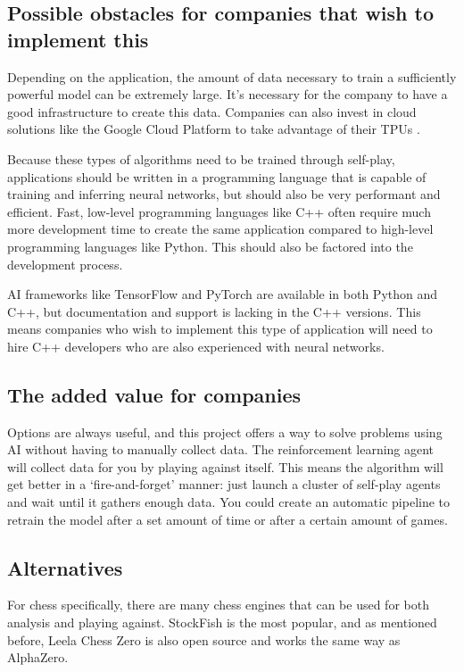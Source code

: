 \documentclass{article}
\begin{document}
\subsection{Possible obstacles for companies that wish to implement this}

Depending on the application, the amount of data necessary to train a sufficiently powerful model
can be extremely large. It's necessary for the company to have a good infrastructure to 
create this data. Companies can also invest in cloud solutions like the Google Cloud Platform
to take advantage of their TPUs \cite{CloudComputingServices}.

Because these types of algorithms need to be trained through self-play, applications should be written
in a programming language that is capable of training and inferring neural networks, 
but should also be very performant and efficient. 
Fast, low-level programming languages like C++ often require much more development time
to create the same application compared to high-level programming languages like Python. 
This should also be factored into the development process.

AI frameworks like TensorFlow and PyTorch are available in both Python and C++, 
but documentation and support is lacking in the C++ versions. This means companies 
who wish to implement this type of application will need to hire C++ developers who
are also experienced with neural networks.

\subsection{The added value for companies}

Options are always useful, and this project offers a way to solve problems 
using AI without having to manually collect data. The reinforcement learning agent 
will collect data for you by playing against itself. This means the algorithm will
get better in a `fire-and-forget' manner: just launch a cluster of self-play agents
and wait until it gathers enough data. You could create an automatic pipeline to
retrain the model after a set amount of time or after a certain amount of games.

\subsection{Alternatives}

For chess specifically, there are many chess engines that can be used for both analysis
and playing against. StockFish is the most popular, and as mentioned before, 
Leela Chess Zero is also open source and works the same way as AlphaZero. 
\end{document}
